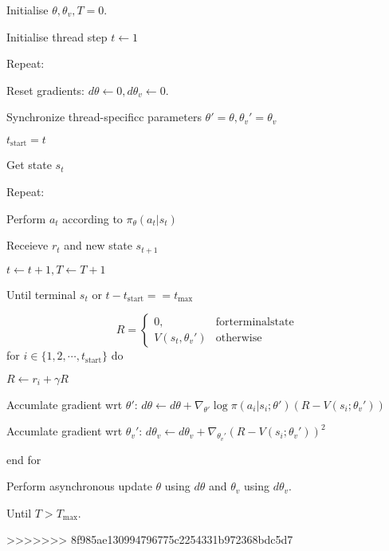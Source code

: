 \documentclass[11pt,a4paper]{article}
\begin{document}
\begin{tcolorbox}[title=A3C algorithm]
Initialise $\theta,\theta_v, T=0$.\par 
Initialise thread step $t \leftarrow 1$ \par 
Repeat:\par 
\hspace{1cm} Reset gradients: $d\theta \leftarrow 0, d\theta_v \leftarrow 0$. \par 
\hspace{1cm} Synchronize thread-specificc parameters $\theta' =\theta, \theta_v'=\theta_v$\par 
\hspace{1cm} $t_{\mathrm{start}} = t$ \par 
\hspace{1cm} Get state $s_t$ \par 
\hspace{1cm} Repeat:\par 
\hspace{2cm} Perform $a_t$ according to $\pi_{\theta}(a_t|s_t)$ \par 
\hspace{2cm} Receieve $r_t$ and new state $s_{t+1}$\par
\hspace{2cm} $t \leftarrow t+1, T \leftarrow T+1 $ \par 
\hspace{1cm} Until terminal $s_t$ or $t-t_{\mathrm{start}} == t_{\max}$ \par 
\hspace{1cm} 
\begin{equation}
    R = \left\{\begin{array}{cc}
        0, & \mathrm{for terminal state} \\ 
        V(s_t, \theta_v') & \mathrm{otherwise}
    \end{array}\right.
\end{equation}
\hspace{1cm} for $i \in \{1,2,\cdots,t_{\mathrm{start}}\}$ do\par 
\hspace{2cm} $R \leftarrow r_i + \gamma R$ \par 
\hspace{2cm} Accumlate gradient wrt $\theta'$: $d\theta \leftarrow d\theta + \nabla_{\theta'} \log \pi(a_i|s_i;\theta')(R-V(s_i;\theta_v'))$ \par 
\hspace{2cm} Accumlate gradient wrt $\theta_v'$: $d\theta_v \leftarrow d\theta_v + \nabla_{\theta_v'}(R-V(s_i;\theta_v'))^2$\par 
\hspace{1cm} end for\par 
\hspace{1cm} Perform asynchronous update $\theta$ using $d\theta$ and $\theta_v$ using $d\theta_v$. \par 
Until $T > T_{\max}$. 
\end{tcolorbox}




>>>>>>> 8f985ae130994796775c2254331b972368bdc5d7

\clearpage


\end{document}
